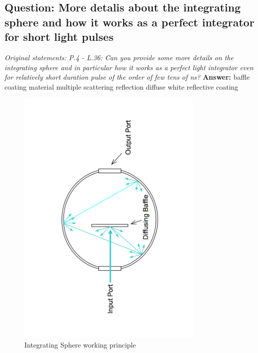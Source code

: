 \documentclass[]{article}
\begin{document}
\subsection{Question: More detalis about the integrating sphere and how it works as a perfect integrator for short light pulses}
\textit{Original statements: P.4 - L.36: Can you provide some more details on the integrating sphere and in particular how it works as a perfect light integrator even for relatively short duration pulse of the order of few tens of ns?}\newline
\textbf{Answer:} \newline
baffle
coating material
multiple scattering reflection
diffuse white reflective coating
\begin{figure}
	\centering
	\includegraphics[width=0.8\textwidth,angle=-90]{is_principle}
	\caption{Integrating Sphere working principle}
\end{figure}
\end{document}

